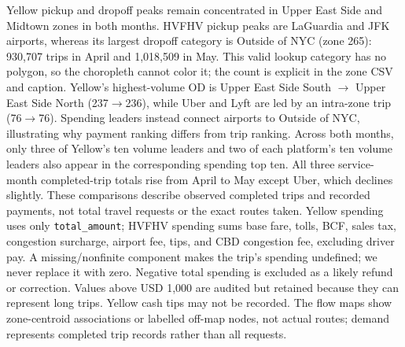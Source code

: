 Yellow pickup and dropoff peaks remain concentrated in Upper East Side and Midtown zones in both months. HVFHV pickup peaks are LaGuardia and JFK airports, whereas its largest dropoff category is Outside of NYC (zone 265): 930,707 trips in April and 1,018,509 in May. This valid lookup category has no polygon, so the choropleth cannot color it; the count is explicit in the zone CSV and caption. Yellow's highest-volume OD is Upper East Side South $\to$ Upper East Side North (237$\to$236), while Uber and Lyft are led by an intra-zone trip (76$\to$76). Spending leaders instead connect airports to Outside of NYC, illustrating why payment ranking differs from trip ranking. Across both months, only three of Yellow's ten volume leaders and two of each platform's ten volume leaders also appear in the corresponding spending top ten. All three service-month completed-trip totals rise from April to May except Uber, which declines slightly. These comparisons describe observed completed trips and recorded payments, not total travel requests or the exact routes taken.
Yellow spending uses only \texttt{total\_amount}; HVFHV spending sums base fare, tolls, BCF, sales tax, congestion surcharge, airport fee, tips, and CBD congestion fee, excluding driver pay. A missing/nonfinite component makes the trip's spending undefined; we never replace it with zero. Negative total spending is excluded as a likely refund or correction. Values above USD 1,000 are audited but retained because they can represent long trips. Yellow cash tips may not be recorded. The flow maps show zone-centroid associations or labelled off-map nodes, not actual routes; demand represents completed trip records rather than all requests.
